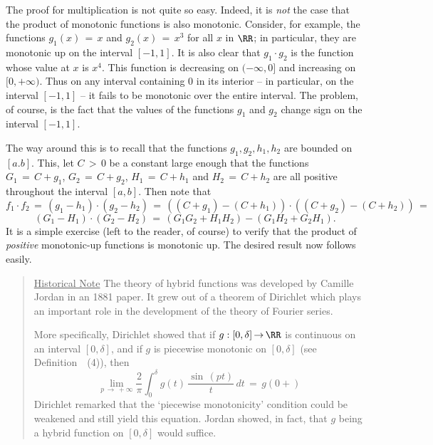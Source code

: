 {        The proof for multiplication is not quite so easy. Indeed, it is {\em not} the case that the product of monotonic functions is also monotonic.
    Consider, for example, the functions $g_{1}(x) \,=\, x$ and $g_{2}(x) \,=\, x^{3}$ for all $x$ in ${\RR}$; in particular, they are monotonic up on the interval $[-1,1]$.
    It is also clear that $g_{1}{\cdot}g_{2}$ is the function whose value at $x$ is $x^{4}$.
    This function is decreasing on $(-{\infty},0]$ and increasing on $[0,+{\infty})$.
    Thus on any interval containing $0$ in its interior -- in particular, on the interval $[-1,1]$ -- it fails to  be monotonic over the entire interval.
    The  problem, of course, is the fact that the values of the functions $g_{1}$ and $g_{2}$ change sign on the interval $[-1,1]$.

        The way around this is to recall that the functions $g_{1},g_{2}, h_{1},h_{2}$ are bounded on $[a.b]$.
    This, let $C\,>\,0$ be a constant large enough that the functions $G_{1} \,=\, C+g_{1}$, $G_{2} \,=\, C+g_{2}$, $H_{1} \,=\, C+h_{1}$ and $H_{2} \,=\, C+h_{2}$ are all positive throughout the interval $[a,b]$.
    Then note that
        \begin{displaymath}
        f_{1}{\cdot}f_{2} \,=\, (g_{1}-h_{1}){\cdot}(g_{2}-h_{2}) \,=\, 
    ((C+g_{1})-(C+h_{1})){\cdot}((C+g_{2})-(C+h_{2})) \,=\, 
        \end{displaymath}
        \begin{displaymath}
    (G_{1}-H_{1}){\cdot}(G_{2}-H_{2}) \,=\, (G_{1}G_{2} + H_{1}H_{2}) - (G_{1}H_{2} + G_{2}H_{1}).
        \end{displaymath}
    It is a simple exercise (left to the reader, of course) to verify that the product of {\em positive} monotonic-up functions is monotonic up.
    The desired result now follows easily.
}%

\V
\V

\begin{quotation}
{\footnotesize \underline{Historical Note}
        The theory of hybrid functions was developed by Camille Jordan in an 1881 paper.
    It grew out of a theorem of Dirichlet which plays an important role in the development of the theory of Fourier series.

        More specifically, Dirichlet showed that if $g:[0,{\delta}]  \,{\rightarrow}\, {\RR}$ is continuous on an interval $[0,{\delta}]$, and if $g$ is piecewise monotonic on $[0,{\delta}]$ (see Definition~~(4)), then
        \begin{displaymath}
        \lim_{p \,{\rightarrow}\, +{\infty}} \frac{2}{{\pi}} \int_{0}^{{\delta}} g(t)\,\frac{{\sin}\,(pt)}{t} \,dt \,=\, g(0+)
        \end{displaymath}
    Dirichlet remarked that the `piecewise monotonicity' condition could be weakened and still yield this equation.
    Jordan showed, in fact, that $g$ being a hybrid function on $[0,{\delta}]$ would suffice.
}%
\end{quotation}

